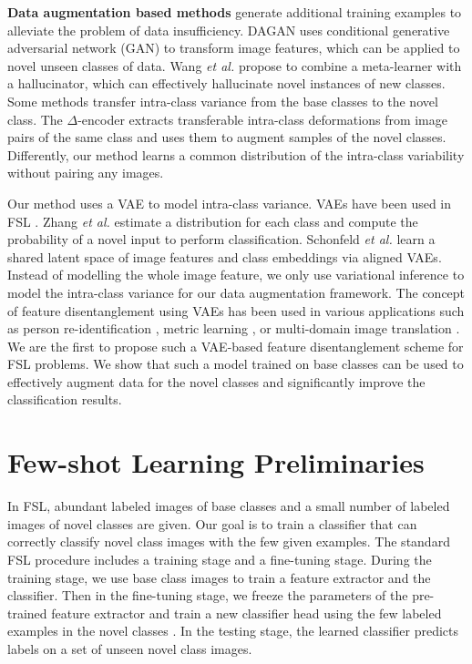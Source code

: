 \documentclass[10pt,twocolumn,letterpaper]{article}
\begin{document}
      \textbf{Data augmentation based methods} \cite{dagan,delta-encoder,wang2018lowshot} generate additional training examples to alleviate the problem of data insufficiency. 
DAGAN \cite{dagan} uses conditional generative adversarial network (GAN) to transform image features, which can be applied to novel unseen classes of data.
Wang \textit{et al.} \cite{wang2018lowshot} propose to combine a meta-learner with a hallucinator, which can effectively hallucinate novel instances of new classes. Some methods transfer intra-class variance from the base classes to the novel class. The $\Delta$-encoder \cite{delta-encoder} extracts transferable intra-class deformations from image pairs of the same class and uses them to augment samples of the novel classes.
      Differently, our method learns a common distribution of the intra-class variability without pairing any images.


Our method uses a VAE to model intra-class variance. VAEs have been used in FSL \cite{variational_fewshot,aligned_vae,proto_vae}.
Zhang \textit{et al.}  \cite{variational_fewshot} estimate a distribution for each class and compute the probability of a
     novel input to perform classification.
Schonfeld \textit{et al.} \cite{aligned_vae} learn a shared latent space of image features and class embeddings via aligned VAEs.
     Instead of modelling the whole image feature, we only use variational inference to model the intra-class variance for our data augmentation framework. The concept of feature disentanglement using VAEs has been used in various applications such as person re-identification \cite{reid2019chanho,Zou2020JointDA}, metric learning \cite{metric_learning}, or multi-domain image translation \cite{unified2018liu,diverse2018lee}.
     We are the first to propose such a VAE-based feature disentanglement scheme for FSL problems. We show that such a model trained on base classes can be used to effectively augment data for the novel classes and significantly improve the classification results.  


\section{Few-shot Learning Preliminaries}
In FSL, abundant labeled images of base classes and a small number of labeled images of novel classes are given.
Our goal is to train a classifier that can correctly classify novel class images with the few given examples.
The standard FSL procedure   includes a training stage and a fine-tuning stage.
During the training stage, we use base class images to train a feature extractor and the classifier.
Then in the fine-tuning stage, we freeze the parameters of the pre-trained feature extractor and train a new classifier head using the few labeled  examples in the novel classes . 
In the testing stage, the learned classifier predicts labels on a set of unseen novel class images.
  
\end{document}
